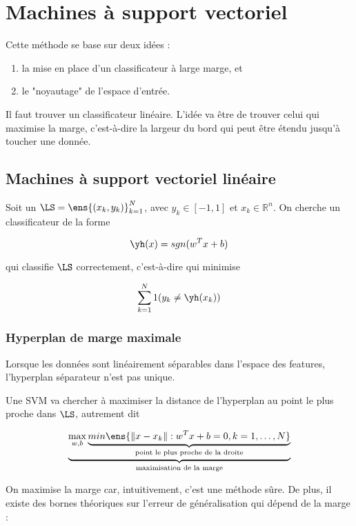 \chapter{Machines à support vectoriel}

Cette méthode se base sur deux idées :

\begin{enumerate}
	\item la mise en place d'un classificateur à large marge, et
	\item le "noyautage" de l'espace d'entrée.
\end{enumerate}

Il faut trouver un classificateur linéaire. L'idée va être de trouver celui qui maximise la marge, c'est-à-dire la largeur du bord qui peut être étendu jusqu'à toucher une donnée.


\section{Machines à support vectoriel linéaire}
	
	Soit un $\LS = \ens{(x_k, y_k)}^N_{k = 1}$, avec $y_k \in [-1, 1]$ et $x_k \in \mathbb{R}^n$. On cherche un classificateur de la forme
	
	$$\yh(x) = sgn(w^T x + b)$$
	
	qui classifie $\LS$ correctement, c'est-à-dire qui minimise
	
	$$\sum_{k = 1}^N1(y_k \neq \yh(x_k))$$
	
	\subsection{Hyperplan de marge maximale}
	
	Lorsque les données sont linéairement séparables dans l'espace des features, l'hyperplan séparateur n'est pas unique.
	
	
	Une SVM va chercher à maximiser la distance de l'hyperplan au point le plus proche dans $\LS$, autrement dit
	
	$$\underbrace{\max_{w, b} \underbrace{min \ens{\Vert x - x_k \Vert : w^T x + b = 0, k = 1, \dots , N}}_{\text{point le plus proche de la droite}}}_{\text{maximisation de la marge}}$$
	
	On maximise la marge car, intuitivement, c'est une méthode sûre. De plus, il existe des bornes théoriques sur l'erreur de généralisation qui dépend de la marge :
	
